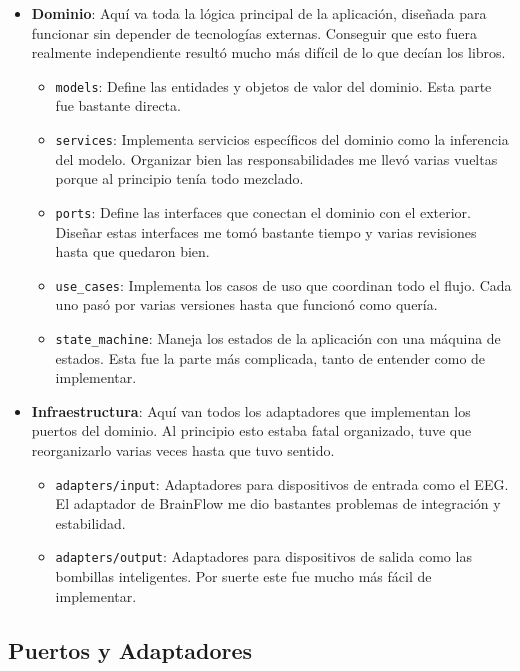 \begin{itemize}
    \item \textbf{Dominio}: Aquí va toda la lógica principal de la aplicación, diseñada para funcionar sin depender de tecnologías externas. Conseguir que esto fuera realmente independiente resultó mucho más difícil de lo que decían los libros.
    \begin{itemize}
        \item \texttt{models}: Define las entidades y objetos de valor del dominio. Esta parte fue bastante directa.
        \item \texttt{services}: Implementa servicios específicos del dominio como la inferencia del modelo. Organizar bien las responsabilidades me llevó varias vueltas porque al principio tenía todo mezclado.
        \item \texttt{ports}: Define las interfaces que conectan el dominio con el exterior. Diseñar estas interfaces me tomó bastante tiempo y varias revisiones hasta que quedaron bien.
        \item \texttt{use\_cases}: Implementa los casos de uso que coordinan todo el flujo. Cada uno pasó por varias versiones hasta que funcionó como quería.
        \item \texttt{state\_machine}: Maneja los estados de la aplicación con una máquina de estados. Esta fue la parte más complicada, tanto de entender como de implementar.
    \end{itemize}
    
    \item \textbf{Infraestructura}: Aquí van todos los adaptadores que implementan los puertos del dominio. Al principio esto estaba fatal organizado, tuve que reorganizarlo varias veces hasta que tuvo sentido.
    \begin{itemize}
        \item \texttt{adapters/input}: Adaptadores para dispositivos de entrada como el EEG. El adaptador de BrainFlow me dio bastantes problemas de integración y estabilidad.
        \item \texttt{adapters/output}: Adaptadores para dispositivos de salida como las bombillas inteligentes. Por suerte este fue mucho más fácil de implementar.
    \end{itemize}
\end{itemize}

\subsection{Puertos y Adaptadores}

